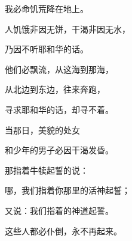 {\par }{\Q 我必命饥荒降在地上。
\par }{\Q 人饥饿非因无饼，干渴非因无水，
\par }{\Q 乃因不听耶和华的话。
\par }{\Q {}他们必飘流，从这海到那海，
\par }{\Q 从北边到东边，往来奔跑，
\par }{\Q 寻求耶和华的话，却寻不着。
\par }{\BB \par }{\Q {}当那日，美貌的处女
\par }{\Q 和少年的男子必因干渴发昏。
\par }{\Q {}那指着{}牛犊起誓的说：
\par }{哪，我们指着你那里的活神起誓；
\par }{\Q 又说：我们指着{}的神道起誓。
\par }{\Q 这些人都必仆倒，永不再起来。

}

